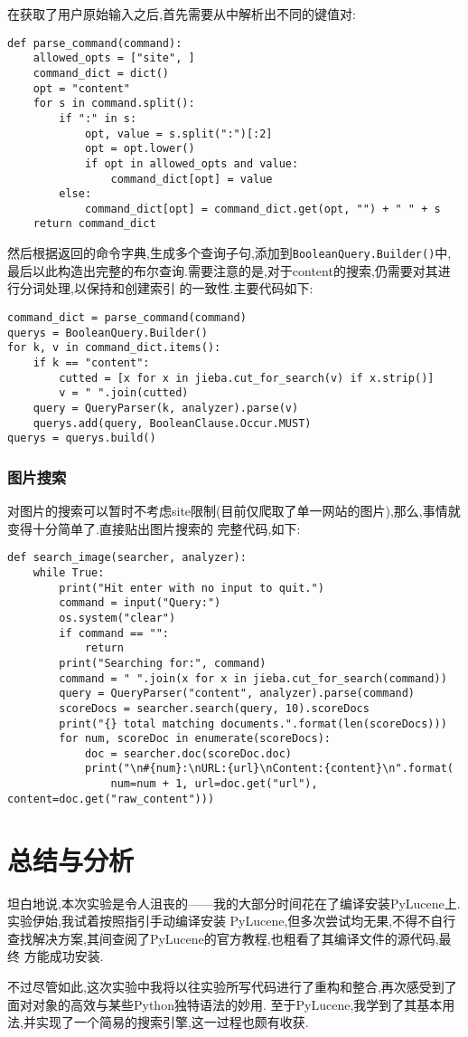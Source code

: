 \documentclass[a4paper]{article}
\begin{document}
在获取了用户原始输入之后,首先需要从中解析出不同的键值对:
\begin{verbatim}
def parse_command(command):
    allowed_opts = ["site", ]
    command_dict = dict()
    opt = "content"
    for s in command.split():
        if ":" in s:
            opt, value = s.split(":")[:2]
            opt = opt.lower()
            if opt in allowed_opts and value:
                command_dict[opt] = value
        else:
            command_dict[opt] = command_dict.get(opt, "") + " " + s
    return command_dict
\end{verbatim}

然后根据返回的命令字典,生成多个查询子句,添加到\texttt{BooleanQuery.Builder()}中,
最后以此构造出完整的布尔查询.需要注意的是,对于content的搜索,仍需要对其进行分词处理,以保持和创建索引
的一致性.主要代码如下:
\begin{verbatim}
command_dict = parse_command(command)
querys = BooleanQuery.Builder()
for k, v in command_dict.items():
    if k == "content":
        cutted = [x for x in jieba.cut_for_search(v) if x.strip()]
        v = " ".join(cutted)
    query = QueryParser(k, analyzer).parse(v)
    querys.add(query, BooleanClause.Occur.MUST)
querys = querys.build()
\end{verbatim}
        \subsubsection{图片搜索}
对图片的搜索可以暂时不考虑site限制(目前仅爬取了单一网站的图片),那么,事情就变得十分简单了.直接贴出图片搜索的
完整代码,如下:
\begin{verbatim}
def search_image(searcher, analyzer):
    while True:
        print("Hit enter with no input to quit.")
        command = input("Query:")
        os.system("clear")
        if command == "":
            return
        print("Searching for:", command)
        command = " ".join(x for x in jieba.cut_for_search(command))
        query = QueryParser("content", analyzer).parse(command)
        scoreDocs = searcher.search(query, 10).scoreDocs
        print("{} total matching documents.".format(len(scoreDocs)))
        for num, scoreDoc in enumerate(scoreDocs):
            doc = searcher.doc(scoreDoc.doc)
            print("\n#{num}:\nURL:{url}\nContent:{content}\n".format(
                num=num + 1, url=doc.get("url"), content=doc.get("raw_content")))
\end{verbatim}
    \newpage
    \section{总结与分析}
坦白地说,本次实验是令人沮丧的——我的大部分时间花在了编译安装PyLucene上.实验伊始,我试着按照指引手动编译安装
PyLucene,但多次尝试均无果,不得不自行查找解决方案,其间查阅了PyLucene的官方教程,也粗看了其编译文件的源代码,最终
方能成功安装.

不过尽管如此,这次实验中我将以往实验所写代码进行了重构和整合,再次感受到了面对对象的高效与某些Python独特语法的妙用.
至于PyLucene,我学到了其基本用法,并实现了一个简易的搜索引擎,这一过程也颇有收获.
\end{document}
